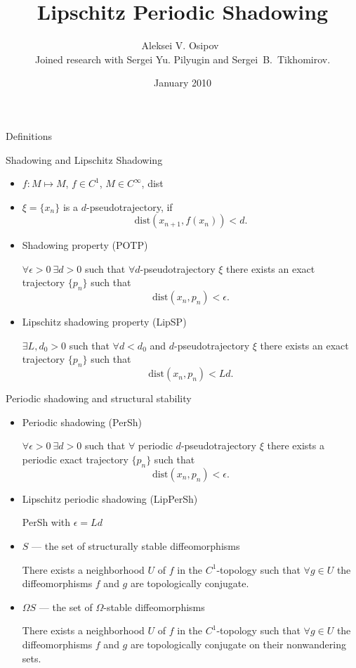 \documentclass{beamer}
\title{Lipschitz Periodic Shadowing}
\author{
Aleksei V. Osipov\inst{1}\ %
\\
{\small{Joined research with Sergei Yu. Pilyugin\inst{1} and Sergei~B.~Tikhomirov\inst{2}.}}
}
\institute{
\inst{1}
Saint-Petersbourg State University
\and
\inst{2}
National Taiwan University
}
\date{January 2010}
\begin{document}
\begin{frame}
\titlepage
\end{frame}
\begin{section}{Definitions}
\begin{frame}{Shadowing and Lipschitz Shadowing}
\begin{itemize}
	\item $f:M\mapsto M$, $f\in C^1$, $M\in C^{\infty}$, dist
	\item $\xi=\{x_n\}$ is a $d$-pseudotrajectory, if 
	$$\mbox{dist}(x_{n+1},f(x_n))<d.$$
	\item Shadowing property (POTP)
	
	$\forall\epsilon>0\ \exists d>0$ such that $\forall d$-pseudotrajectory $\xi$ there exists an exact trajectory $\{p_n\}$ such that
	$$\mbox{dist}(x_n,p_n)<\epsilon.$$
	\item Lipschitz shadowing property (LipSP)
	
	$\exists L,d_0>0$ such that $\forall d<d_0$ and $d$-pseudotrajectory $\xi$ there exists an exact trajectory $\{p_n\}$ such that
	$$\mbox{dist}(x_n,p_n)<Ld.$$ 
\end{itemize}
\end{frame}
\begin{frame}{Periodic shadowing and structural stability}
\begin{itemize}
	\item Periodic shadowing (PerSh)
	
		$\forall\epsilon>0\ \exists d>0$ such that $\forall$ periodic $d$-pseudotrajectory $\xi$ there exists a periodic exact trajectory $\{p_n\}$ such that
	$$\mbox{dist}(x_n,p_n)<\epsilon.$$
	\item Lipschitz periodic shadowing (LipPerSh)
	
	PerSh with $\epsilon=Ld$
	\item $S$ --- the set of structurally stable diffeomorphisms
	
	There exists a neighborhood $U$ of $f$ in the $C^1$-topology such that $\forall g\in U$ the diffeomorphisms $f$ and $g$ are topologically conjugate.
	\item $\Omega S$ --- the set of $\Omega$-stable diffeomorphisms
	
		There exists a neighborhood $U$ of $f$ in the $C^1$-topology such that $\forall g\in U$ the diffeomorphisms $f$ and $g$ are topologically conjugate on their nonwandering sets.
\end{itemize}
\end{frame}
\end{section}
\end{document}
